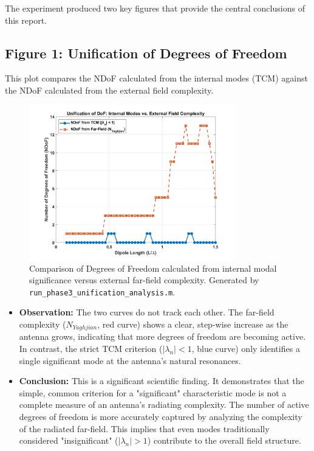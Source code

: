 \documentclass[11pt, a4paper]{article}
\begin{document}
The experiment produced two key figures that provide the central conclusions of this report.

\subsection{Figure 1: Unification of Degrees of Freedom}
This plot compares the NDoF calculated from the internal modes (TCM) against the NDoF calculated from the external field complexity.

\begin{figure}[H]
    \centering
    \includegraphics[width=0.8\textwidth]{Fig_Phase3_DoF_Unification.png}
    \caption{Comparison of Degrees of Freedom calculated from internal modal significance versus external far-field complexity. Generated by \texttt{run\_phase3\_unification\_analysis.m}.}
    \label{fig:dof}
\end{figure}

\begin{itemize}
    \item \textbf{Observation:} The two curves do not track each other. The far-field complexity ($N_{Yaghjian}$, red curve) shows a clear, step-wise increase as the antenna grows, indicating that more degrees of freedom are becoming active. In contrast, the strict TCM criterion ($|\lambda_n| < 1$, blue curve) only identifies a single significant mode at the antenna's natural resonances.
    \item \textbf{Conclusion:} This is a significant scientific finding. It demonstrates that the simple, common criterion for a "significant" characteristic mode is not a complete measure of an antenna's radiating complexity. The number of active degrees of freedom is more accurately captured by analyzing the complexity of the radiated far-field. This implies that even modes traditionally considered "insignificant" ($|\lambda_n| > 1$) contribute to the overall field structure.
\end{itemize}
\end{document}
